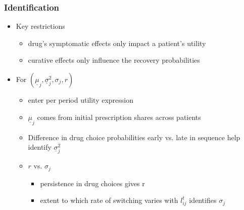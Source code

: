 \documentclass[xcolor=pdftex,dvipsnames,table,mathserif,aspectratio=169]{beamer}
\begin{document}
\begin{frame}
\frametitle{Identification}

\begin{itemize}
\item Key restrictions

\begin{itemize}
\item drug's symptomatic effects only impact a patient's utility

\item curative effects only influence the recovery probabilities
\end{itemize}

\item For $(\underline{\mu }_{j},\underline{\sigma }_{j}^{2},\sigma _{j},r)$

\begin{itemize}
\item enter per period utility expression

\item $\underline{\mu }_{j}$ comes from initial prescription shares across
patients

\item Difference in drug choice probabilities early vs. late in sequence
help identify $\underline{\sigma }_{j}^{2}$

\item $r$ vs. $\sigma _{j}$

\begin{itemize}
\item persistence in drug choices gives r

\item extent to which rate of switching varies with $l_{ij}^{t}$ identifies $%
\sigma _{j}$
\end{itemize}
\end{itemize}
\end{itemize}
\end{frame}


\end{document}

